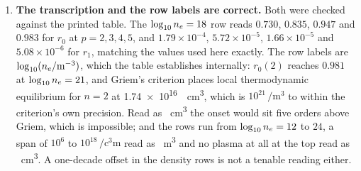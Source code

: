 \begin{enumerate}
\item \textbf{The transcription and the row labels are correct.} Both were
checked against the printed table. The $\log_{10}n_e = 18$ row reads
$0.730$, $0.835$, $0.947$ and $0.983$ for $r_0$ at $p = 2, 3, 4, 5$, and
$1.79\times10^{-4}$, $5.72\times10^{-5}$, $1.66\times10^{-5}$ and
$5.08\times10^{-6}$ for $r_1$, matching the values used here exactly. The row
labels are $\log_{10}(n_e/\si{\per\cubic\metre})$, which the table establishes
internally: $r_0(2)$ reaches $0.981$ at $\log_{10}n_e = 21$, and Griem's
criterion places local thermodynamic equilibrium for $n=2$ at
\SI{1.74e16}{\per\cubic\centi\metre}, which is $10^{21}\,\si{\per\cubic\metre}$
to within the criterion's own precision. Read as \si{\per\cubic\centi\metre} the
onset would sit five orders above Griem, which is impossible; and the rows run
from $\log_{10}n_e = 12$ to $24$, a span of $10^{6}$ to
$10^{18}\,\si{\per\cubic\centi\metre}$ read as \si{\per\cubic\metre} and no
plasma at all at the top read as \si{\per\cubic\centi\metre}. A one-decade
offset in the density rows is not a tenable reading either.
\end{enumerate}

